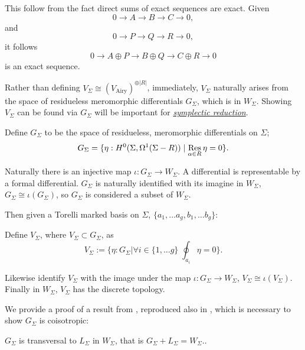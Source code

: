        
        This follow from the fact direct sums of exact sequences are exact. Given
        \[ 0 \rightarrow A \rightarrow B \rightarrow C \rightarrow 0,\]
        and
        \[ 0 \rightarrow P \rightarrow Q \rightarrow R \rightarrow 0,\]
        it follows
        \[  0 \rightarrow A \oplus P \rightarrow B \oplus Q \rightarrow C \oplus R \rightarrow 0 \]
        is an exact sequence.


        Rather than defining \( V_\Sigma \cong (V_{\mathrm{Airy}})^{\oplus |R|}\), immediately, \(V_\Sigma\) naturally arises from the space of residueless meromorphic differentials \(G_\Sigma\), which is in \(W_\Sigma\).
        Showing \(V_\Sigma\) can be found via \(G_\Sigma\) will be important for \hyperref[chapter:symplecticreduction]{\emph{symplectic reduction}}.
        \begin{defn}     
        Define \(G_\Sigma\) to be the space of residueless, meromorphic differentials on \(\Sigma\);
        \[ G_\Sigma=\{ \eta :  H^0(\Sigma,\Omega^1(\Sigma-R)) \mid \operatorname*{Res}_{\alpha \in R}\eta=0 \}. \] 
        \end{defn}    

        Naturally there is an injective map \(\iota : G_\Sigma \rightarrow W_\Sigma\). A differential is representable by a formal differential. \(G_\Sigma\) is naturally identified with its imagine in \(W_\Sigma\), \( G_\Sigma \cong \iota(G_\Sigma)\), so \(G_\Sigma\) is considered a subset of \(W_\Sigma\). 
        
        Then given a Torelli marked basis on \(\Sigma\), \( \{ a_1, \dots a_g, b_1, \dots b_g\}\):
            
        \begin{defn} Define \( V_\Sigma \), where \(V_\Sigma \subset G_\Sigma \), as 
        \[ V_\Sigma := \{ \eta : G_\Sigma   | \forall i \in \{1,\dots g\} \; \oint_{a_i} \eta = 0\}. \]
        \end{defn}
        Likewise identify \(V_\Sigma\) with the image under the map \(\iota: G_\Sigma \rightarrow W_\Sigma\), \(V_\Sigma \cong \iota (V_\Sigma)\). Finally in \(W_\Sigma\), \(V_\Sigma\) has the discrete topology.
        
        We provide a proof of a result from \cite{ks_airy}, reproduced also in \cite{chaimanowong2020airy}, which is necessary to show \( G_\Sigma\) is coisotropic:
        \begin{prop} \(G_\Sigma\) is transversal to \(L_\Sigma \) in \(W_\Sigma\), that is
        \( G_\Sigma + L_\Sigma = W_\Sigma. \).
        \end{prop}
        
